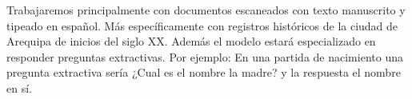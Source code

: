 \documentclass[../main.tex]{subfiles}
\begin{document}
%
%


Trabajaremos principalmente con documentos escaneados con texto manuscrito y tipeado en español.
Más específicamente con registros históricos de la ciudad de Arequipa de inicios del siglo XX.
Además el modelo estará especializado en responder preguntas extractivas.
Por ejemplo: En una partida de nacimiento una pregunta extractiva sería ¿Cual es el nombre la madre?
y la respuesta el nombre en sí.


\end{document}
